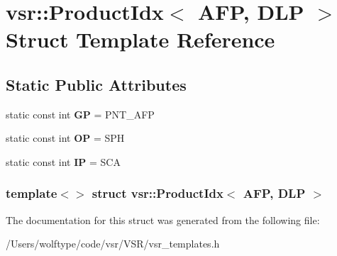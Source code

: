 \hypertarget{structvsr_1_1_product_idx_3_01_a_f_p_00_01_d_l_p_01_4}{\section{vsr\-:\-:Product\-Idx$<$ A\-F\-P, D\-L\-P $>$ Struct Template Reference}
\label{structvsr_1_1_product_idx_3_01_a_f_p_00_01_d_l_p_01_4}
}
\subsection*{Static Public Attributes}
\begin{DoxyCompactItemize}
\item 
\hypertarget{structvsr_1_1_product_idx_3_01_a_f_p_00_01_d_l_p_01_4_a16d25218a21803cfe5fddf7913ebdfbc}{static const int {\bfseries G\-P} = P\-N\-T\-\_\-\-A\-F\-P}\label{structvsr_1_1_product_idx_3_01_a_f_p_00_01_d_l_p_01_4_a16d25218a21803cfe5fddf7913ebdfbc}

\item 
\hypertarget{structvsr_1_1_product_idx_3_01_a_f_p_00_01_d_l_p_01_4_a75ed44347316331665aa202e23aa578e}{static const int {\bfseries O\-P} = S\-P\-H}\label{structvsr_1_1_product_idx_3_01_a_f_p_00_01_d_l_p_01_4_a75ed44347316331665aa202e23aa578e}

\item 
\hypertarget{structvsr_1_1_product_idx_3_01_a_f_p_00_01_d_l_p_01_4_a1338660255660737eb3e7b37cc09d8bd}{static const int {\bfseries I\-P} = S\-C\-A}\label{structvsr_1_1_product_idx_3_01_a_f_p_00_01_d_l_p_01_4_a1338660255660737eb3e7b37cc09d8bd}

\end{DoxyCompactItemize}
\subsubsection*{template$<$$>$ struct vsr\-::\-Product\-Idx$<$ A\-F\-P, D\-L\-P $>$}



The documentation for this struct was generated from the following file\-:\begin{DoxyCompactItemize}
\item 
/\-Users/wolftype/code/vsr/\-V\-S\-R/vsr\-\_\-templates.\-h\end{DoxyCompactItemize}
